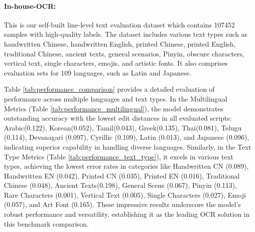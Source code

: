 \documentclass[11pt, a4paper,logo,  copyright, nonumbering]{paddleocr}
\begin{document}
\paragraph{In-house-OCR:} This is our self-built line-level text evaluation dataset which contains 107452 samples with high-quality labels. The dataset includes various text types such as handwritten Chinese, handwritten English, printed Chinese, printed English, traditional Chinese, ancient texts, general scenarios, Pinyin, obscure characters, vertical text, single characters, emojis, and artistic fonts. It also comprises evaluation sets for 109 languages, such as Latin and Japanese. 

Table \ref{tab:performance_comparison} provides a detailed evaluation of performance across multiple languages and text types. In the Multilingual Metrics (Table \ref{tab:performance_multilingual}), the model demonstrates outstanding accuracy with the lowest edit distances in all evaluated scripts: Arabic(0.122), Korean(0.052), Tamil(0.043), Greek(0.135), Thai(0.081), Telugu (0.114), Devanagari (0.097), Cyrillic (0.109), Latin (0.013), and Japanese (0.096), indicating superior capability in handling diverse languages. Similarly, in the Text Type Metrics (Table \ref{tab:performance_text_type}), it excels in various text types, achieving the lowest error rates in categories like Handwritten CN (0.089), Handwritten EN (0.042), Printed CN (0.035), Printed EN (0.016), Traditional Chinese (0.048), Ancient Texts(0.198), General Scene (0.067), Pinyin (0.113), Rare Characters (0.001), Vertical Text (0.005), Single Characters (0.027), Emoji (0.057), and Art Font (0.165). These impressive results underscore the model's robust performance and versatility, establishing it as the leading OCR solution in this benchmark comparison.
\end{document}
